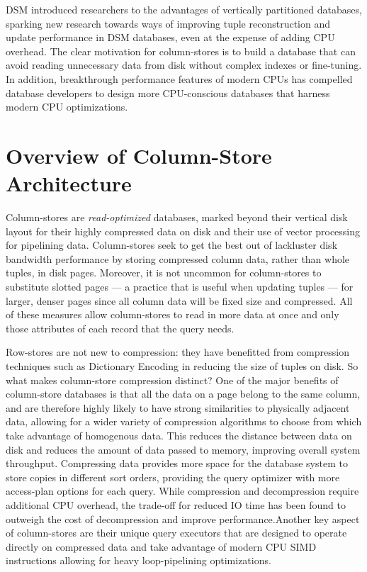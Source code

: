 \documentclass[11pt,a4paper]{report}
\begin{document}
DSM introduced researchers to the advantages of vertically partitioned databases, sparking new research towards ways of improving tuple reconstruction and update performance in DSM databases, even at the expense of adding CPU overhead.\cite{ramamurthy2003case, boncz2005monetdb} The clear motivation for column-stores is to build a database that can avoid reading unnecessary data from disk without complex indexes or fine-tuning. In addition, breakthrough performance features of modern CPUs has compelled database developers to design more CPU-conscious databases that harness modern CPU optimizations. \cite{boncz2005monetdb}

\section{Overview of Column-Store Architecture}
Column-stores are \textit{read-optimized} databases, marked beyond their vertical disk layout for their highly compressed data on disk and their use of vector processing for pipelining data. \cite{stonebraker2005c, boncz2005monetdb} Column-stores seek to get the best out of lackluster disk bandwidth performance by storing compressed column data, rather than whole tuples, in disk pages. Moreover, it is not uncommon for column-stores to substitute slotted pages --- a practice that is useful when updating tuples --- for larger, denser pages since all column data will be fixed size and compressed. \cite{harizopoulos2006performance} All of these measures allow column-stores to read in more data at once and only those attributes of each record that the query needs. 

Row-stores are not new to compression: they have benefitted from compression techniques such as Dictionary Encoding in reducing the size of tuples on disk.\cite{abadi2006integrating} So what makes column-store compression distinct? One of the major benefits of column-store databases is that all the data on a page belong to the same column, and are therefore highly likely to have strong similarities to physically adjacent data, allowing for a wider variety of compression algorithms to choose from which take advantage of homogenous data.\cite{abadi2006integrating} This reduces the distance between data on disk and reduces the amount of data passed to memory, improving overall system throughput.\cite{abadi2006integrating} Compressing data provides more space for the database system to store copies in different sort orders, providing the query optimizer with more access-plan options for each query.\cite{stonebraker2005c} While compression and decompression require additional CPU overhead, the trade-off for reduced IO time has been found to outweigh the cost of decompression and improve performance.\cite{boncz2005monetdb, abadi2006integrating}Another key aspect of column-stores are their unique query executors that are designed to operate directly on compressed data and take advantage of modern CPU SIMD instructions allowing for heavy loop-pipelining optimizations. \cite{boncz2005monetdb, abadi2006integrating}
\end{document}
